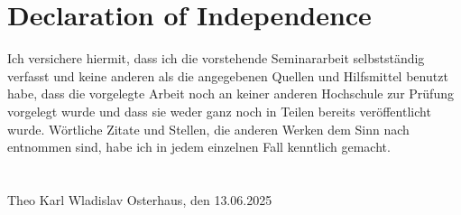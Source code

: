 \documentclass[12pt,a4paper,titlepage]{article}
\numberwithin{equation}{section}
\numberwithin{table}{section}
\numberwithin{figure}{section}
\begin{document}
\clearpage

\section*{Declaration of Independence}
    Ich versichere hiermit, dass ich die vorstehende Seminararbeit selbstständig verfasst und keine anderen als die angegebenen Quellen und Hilfsmittel benutzt habe, dass die vorgelegte Arbeit noch an keiner anderen Hochschule zur Prüfung vorgelegt wurde und dass sie weder ganz noch in Teilen bereits veröffentlicht wurde. Wörtliche Zitate und Stellen, die anderen Werken dem Sinn nach entnommen sind, habe ich in jedem einzelnen Fall kenntlich gemacht.
    \\
    \\
    \\
    Theo Karl Wladislav Osterhaus, den 13.06.2025
\end{document}
